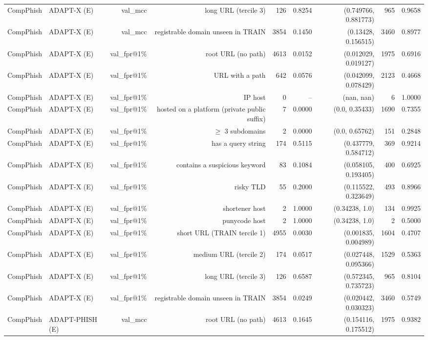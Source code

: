 \begin{table}[t]
\begin{tabular}{llrrrrrrr}
CompPhish & ADAPT-X (E) & val\_mcc & long URL (tercile 3) & 126 & 0.8254 & (0.749766, 0.881773) & 965 & 0.9658 \\
CompPhish & ADAPT-X (E) & val\_mcc & registrable domain unseen in TRAIN & 3854 & 0.1450 & (0.13428, 0.156515) & 3460 & 0.8977 \\
CompPhish & ADAPT-X (E) & val\_fpr@1\% & root URL (no path) & 4613 & 0.0152 & (0.012029, 0.019127) & 1975 & 0.6916 \\
CompPhish & ADAPT-X (E) & val\_fpr@1\% & URL with a path & 642 & 0.0576 & (0.042099, 0.078429) & 2123 & 0.4668 \\
CompPhish & ADAPT-X (E) & val\_fpr@1\% & IP host & 0 & -- & (nan, nan) & 6 & 1.0000 \\
CompPhish & ADAPT-X (E) & val\_fpr@1\% & hosted on a platform (private public suffix) & 7 & 0.0000 & (0.0, 0.35433) & 1690 & 0.7355 \\
CompPhish & ADAPT-X (E) & val\_fpr@1\% & $\geq$ 3 subdomains & 2 & 0.0000 & (0.0, 0.65762) & 151 & 0.2848 \\
CompPhish & ADAPT-X (E) & val\_fpr@1\% & has a query string & 174 & 0.5115 & (0.437779, 0.584712) & 369 & 0.9214 \\
CompPhish & ADAPT-X (E) & val\_fpr@1\% & contains a suspicious keyword & 83 & 0.1084 & (0.058105, 0.193405) & 400 & 0.6925 \\
CompPhish & ADAPT-X (E) & val\_fpr@1\% & risky TLD & 55 & 0.2000 & (0.115522, 0.323649) & 493 & 0.8966 \\
CompPhish & ADAPT-X (E) & val\_fpr@1\% & shortener host & 2 & 1.0000 & (0.34238, 1.0) & 134 & 0.9925 \\
CompPhish & ADAPT-X (E) & val\_fpr@1\% & punycode host & 2 & 1.0000 & (0.34238, 1.0) & 2 & 0.5000 \\
CompPhish & ADAPT-X (E) & val\_fpr@1\% & short URL (TRAIN tercile 1) & 4955 & 0.0030 & (0.001835, 0.004989) & 1604 & 0.4707 \\
CompPhish & ADAPT-X (E) & val\_fpr@1\% & medium URL (tercile 2) & 174 & 0.0517 & (0.027448, 0.095366) & 1529 & 0.5363 \\
CompPhish & ADAPT-X (E) & val\_fpr@1\% & long URL (tercile 3) & 126 & 0.6587 & (0.572345, 0.735723) & 965 & 0.8104 \\
CompPhish & ADAPT-X (E) & val\_fpr@1\% & registrable domain unseen in TRAIN & 3854 & 0.0249 & (0.020442, 0.030323) & 3460 & 0.5749 \\
CompPhish & ADAPT-PHISH (E) & val\_mcc & root URL (no path) & 4613 & 0.1645 & (0.154116, 0.175512) & 1975 & 0.9382 \\

\end{tabular}
\end{table}
